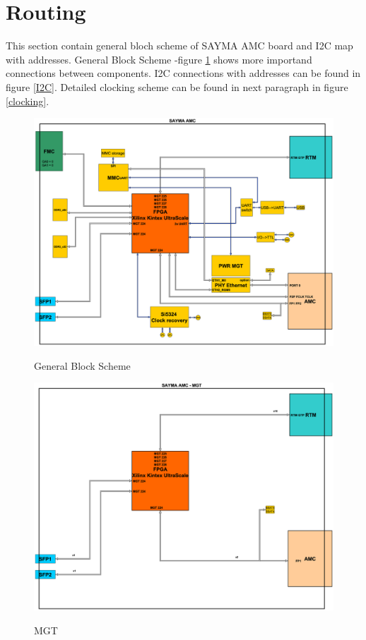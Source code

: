 \section{Routing}


This section contain general bloch scheme of SAYMA AMC board and I2C map with addresses. General Block Scheme -figure \ref{BlockScheme}
shows more importand connections between components. I2C connections with addresses can be found in figure \ref{I2C}. Detailed clocking scheme can be found in next paragraph in figure \ref{clocking}.
	\begin{figure}[htbp!]
		\centering
		\includegraphics[scale=0.2]{img/sch.eps}\\
		\caption{General Block Scheme}\label{BlockScheme}
	\end{figure}


	\begin{figure}[htbp!]
		\centering
		\includegraphics[scale=0.2]{img/sch_mgt.eps}\\
		\caption{MGT} \label{MGT}
	\end{figure}

